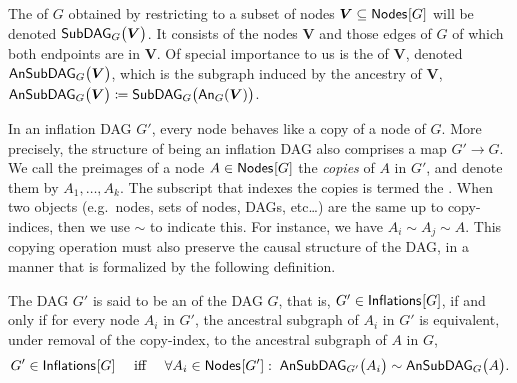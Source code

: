The  of $G$ obtained by restricting to a subset of nodes $\bm{V}\subseteq \SmallNamedFunction{Nodes}{G}$ will be denoted $\subgraph[G]{\bm{V}}$.
It consists of the nodes $\bm{V}$ and those edges of $G$ of which both endpoints are in $\bm{V}$. Of special importance to us is the 
 of $\bm{V}$, denoted $\ansubgraph[G]{\bm{V}}$, which is the subgraph induced by the ancestry of $\bm{V}$, $\ansubgraph[G]{\bm{V}}\coloneqq\subgraph[G]{\An[G]{\bm{V}}}$. 

In an inflation DAG $G'$, every node behaves like a copy of a node of $G$. More precisely, the structure of being an inflation DAG also comprises a map $G'\to G$. We call the preimages of a node $A\in\nodes{G}$ the \emph{copies} of $A$ in $G'$, and denote them by $A_1,\ldots, A_k$. The subscript that indexes the copies is termed the .  When two objects (e.g.~nodes, sets of nodes, DAGs, etc\ldots) are the same up to copy-indices, then we use $\sim$ to indicate this.  For instance, we have $A_i\sim A_j\sim A$.   This copying operation must also preserve the causal structure of the DAG, in a manner that is formalized by the following definition. 
\begin{definition}
The DAG $G'$ is said to be an  of the DAG $G$, that is, $G' \in \SmallNamedFunction{Inflations}{G}$, if and only if  for every node $A_i$ in $G'$, the ancestral subgraph of $A_i$ in $G'$ is equivalent, under removal of the copy-index, to the ancestral subgraph of $A$ in $G$,
\begin{align}\label{eq:definflationDAG}
G' \in\SmallNamedFunction{Inflations}{G} \quad\text{ iff }\quad \forall A_i\in \SmallNamedFunction{Nodes}{G'}:\; \ansubgraph[G']{A_i}\sim\ansubgraph[G]{A}.
\end{align}
\end{definition}

